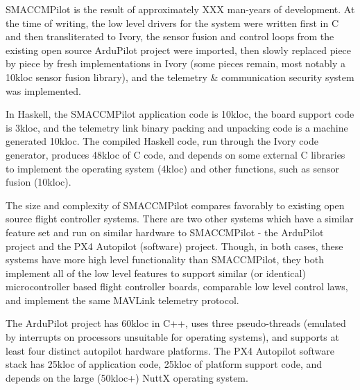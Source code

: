 SMACCMPilot is the result of approximately XXX man-years of development. At the
time of writing, the low level drivers for the system were written first in C
and then transliterated to Ivory, the sensor fusion and control loops from the
existing open source ArduPilot project were imported, then slowly replaced piece
by piece by fresh implementations in Ivory (some pieces remain, most notably a
10kloc sensor fusion library), and the telemetry \& communication security
system was implemented.

In Haskell, the SMACCMPilot application code is 10kloc, the board support code
is 3kloc, and the telemetry link binary packing and unpacking code is a machine
generated 10kloc. The compiled Haskell code, run through the Ivory code
generator, produces 48kloc of C code, and depends on some external C libraries
to implement the operating system (4kloc) and other functions, such as sensor
fusion (10kloc).

The size and complexity of SMACCMPilot compares favorably to existing open
source flight controller systems. There are two other systems which have a
similar feature set and run on similar hardware to SMACCMPilot - the ArduPilot
project and the PX4 Autopilot (software) project. Though, in both cases, these
systems have more high level functionality than SMACCMPilot, they both implement
all of the low level features to support similar (or identical) microcontroller
based flight controller boards, comparable low level control laws, and implement
the same MAVLink telemetry protocol.

The ArduPilot project has 60kloc in C++, uses three pseudo-threads (emulated by
interrupts on processors unsuitable for operating systems), and supports at
least four distinct autopilot hardware platforms. The PX4 Autopilot software
stack has 25kloc of application code, 25kloc of platform support code, and
depends on the large (50kloc+) NuttX operating system.

